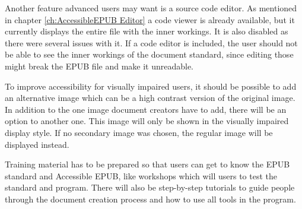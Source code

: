 Another feature advanced users may want is a source code editor. As mentioned in chapter \ref{ch:AccessibleEPUB Editor} a code viewer is already available, but it currently displays the entire file with the inner workings. It is also disabled as there were several issues with it. If a code editor is included, the user should not be able to see the inner workings of the document standard, since editing those might break the EPUB file and make it unreadable. 

To improve accessibility for visually impaired users, it should be possible to add an alternative image which can be a high contrast version of the original image. In addition to the one image document creators have to add, there will be an option to another one. This image will only be shown in the visually impaired display style. If no secondary image was chosen, the regular image will be displayed instead.

Training material has to be prepared so that users can get to know the EPUB standard and Accessible EPUB, like workshops which will users to test the standard and program. There will also be step-by-step tutorials to guide people through the document creation process and how to use all tools in the program.


